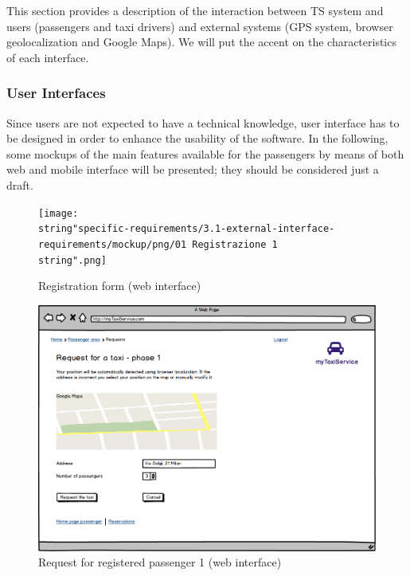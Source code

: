 This section provides a description of the interaction between TS
system and users (passengers and taxi drivers) and external systems
(GPS system, browser geolocalization and Google Maps). We will put
the accent on the characteristics of each interface.


\subsubsection{User Interfaces }

Since users are not expected to have a technical knowledge, user interface
has to be designed in order to enhance the usability of the software.
In the following, some mockups of the main features available for
the passengers by means of both web and mobile interface will be presented;
they should be considered just a draft.

\begin{figure}[H]
\begin{centering}
\texttt{[image: \\string"specific-requirements/3.1-external-interface-requirements/mockup/png/01 Registrazione 1\\string".png]}
\par\end{centering}

\protect\caption{Registration form (web interface)}


\end{figure}


\begin{figure}[H]
\centering{}\includegraphics[scale=0.4]{specific-requirements/3.1-external-interface-requirements/mockup/png/request1}\protect\caption{Request for registered passenger 1 (web interface)}
\end{figure}


